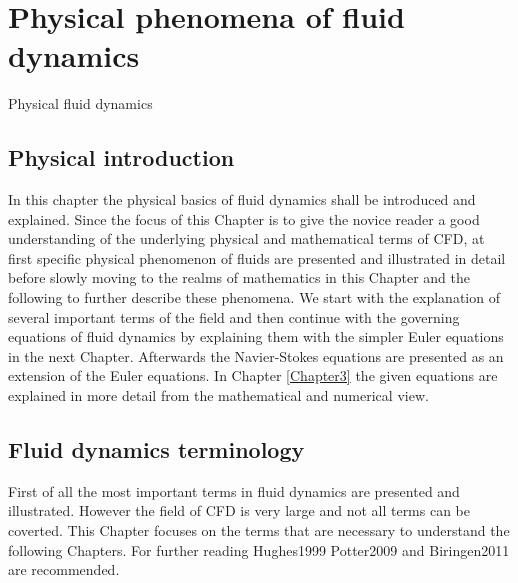 %
%
%



\chapter{Physical phenomena of fluid dynamics} %

\label{Chapter2} %

Physical fluid dynamics

\section {Physical introduction}

In this chapter the physical basics of fluid dynamics shall be introduced and explained. Since the focus of this Chapter is to give the novice reader a good understanding  of the underlying physical and mathematical terms of CFD, at first specific physical phenomenon of fluids are presented and illustrated in detail before slowly moving to the realms of mathematics in this Chapter and the following to further describe these phenomena. We start with the explanation of several important terms of the field and then continue with the governing equations of fluid dynamics by explaining them with the simpler Euler equations in the next Chapter. Afterwards the Navier-Stokes equations are presented as an extension of the Euler equations. In Chapter \ref{Chapter3}  the given equations are explained in more detail from the mathematical and numerical view.



\section{Fluid dynamics terminology}
First of all the most important terms in fluid dynamics are presented and illustrated. However the field of
CFD is very large and not all terms can be coverted. This Chapter focuses on the terms that are necessary to understand the following Chapters. For further reading Hughes1999 Potter2009 and Biringen2011 are recommended.

